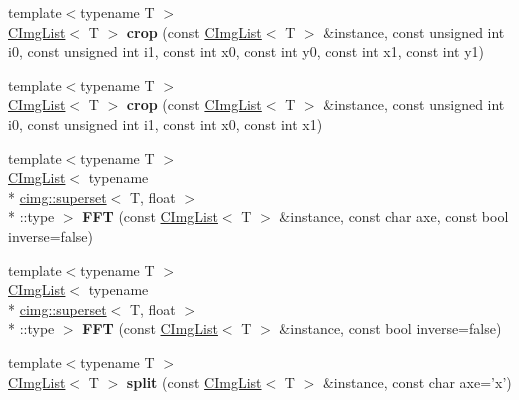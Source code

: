 \begin{DoxyCompactItemize}
\item 
\hypertarget{namespacecimg__library_af6dcdb1ab7fa18a716443e5e7dd7533f}{{\footnotesize template$<$typename T $>$ }\\\hyperlink{structcimg__library_1_1_c_img_list}{C\-Img\-List}$<$ T $>$ {\bfseries crop} (const \hyperlink{structcimg__library_1_1_c_img_list}{C\-Img\-List}$<$ T $>$ \&instance, const unsigned int i0, const unsigned int i1, const int x0, const int y0, const int x1, const int y1)}\label{namespacecimg__library_af6dcdb1ab7fa18a716443e5e7dd7533f}

\item 
\hypertarget{namespacecimg__library_a75d8b03eaa62660cc18e047d9611b82e}{{\footnotesize template$<$typename T $>$ }\\\hyperlink{structcimg__library_1_1_c_img_list}{C\-Img\-List}$<$ T $>$ {\bfseries crop} (const \hyperlink{structcimg__library_1_1_c_img_list}{C\-Img\-List}$<$ T $>$ \&instance, const unsigned int i0, const unsigned int i1, const int x0, const int x1)}\label{namespacecimg__library_a75d8b03eaa62660cc18e047d9611b82e}

\item 
\hypertarget{namespacecimg__library_ab24563ad490677184e72f277d378a05b}{{\footnotesize template$<$typename T $>$ }\\\hyperlink{structcimg__library_1_1_c_img_list}{C\-Img\-List}$<$ typename \\*
\hyperlink{structcimg__library_1_1cimg_1_1superset}{cimg\-::superset}$<$ T, float $>$\\*
\-::type $>$ {\bfseries F\-F\-T} (const \hyperlink{structcimg__library_1_1_c_img_list}{C\-Img\-List}$<$ T $>$ \&instance, const char axe, const bool inverse=false)}\label{namespacecimg__library_ab24563ad490677184e72f277d378a05b}

\item 
\hypertarget{namespacecimg__library_a66d5a36c7e99e26b1d7da73d9c34e546}{{\footnotesize template$<$typename T $>$ }\\\hyperlink{structcimg__library_1_1_c_img_list}{C\-Img\-List}$<$ typename \\*
\hyperlink{structcimg__library_1_1cimg_1_1superset}{cimg\-::superset}$<$ T, float $>$\\*
\-::type $>$ {\bfseries F\-F\-T} (const \hyperlink{structcimg__library_1_1_c_img_list}{C\-Img\-List}$<$ T $>$ \&instance, const bool inverse=false)}\label{namespacecimg__library_a66d5a36c7e99e26b1d7da73d9c34e546}

\item 
\hypertarget{namespacecimg__library_a1ddcf5c3e8f50fd70eb262e566d64ff1}{{\footnotesize template$<$typename T $>$ }\\\hyperlink{structcimg__library_1_1_c_img_list}{C\-Img\-List}$<$ T $>$ {\bfseries split} (const \hyperlink{structcimg__library_1_1_c_img_list}{C\-Img\-List}$<$ T $>$ \&instance, const char axe='x')}\label{namespacecimg__library_a1ddcf5c3e8f50fd70eb262e566d64ff1}


\end{DoxyCompactItemize}

